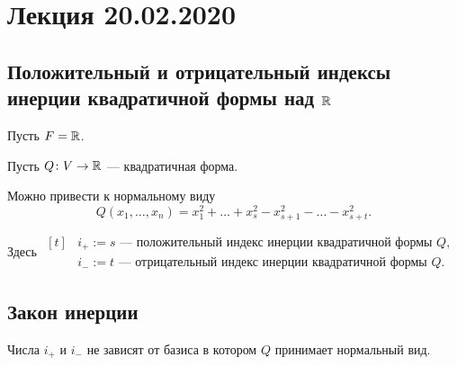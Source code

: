 \section{Лекция 20.02.2020}

\begin{comment}
    Для $F = \CC$ всякую квадратичную форму можно привести к виду \eqref{lec21:1}, где $k = \rk Q$.
    \begin{equation}
        \label{lec21:1}
        Q = x_1^2 + \dots + x_k^2
    .\end{equation}
\end{comment}


\subsection{Положительный и отрицательный индексы инерции квадратичной формы над $\mathbb{R}$}

Пусть $F = \mathbb{R}$.

Пусть $Q \colon V \to \mathbb{R}$ --- квадратичная форма.

Можно привести к нормальному виду
\begin{equation*}
    Q(x_1, \dots, x_n) = x_1^2 + \dots + x_s^2 - x_{s + 1}^2 - \dots - x_{s + t}^2
.\end{equation*}

Здесь
\begin{math}
    \begin{aligned}[t]
        &i_+ := s \text{ --- положительный индекс инерции квадратичной формы $Q$}, \\
        &i_- := t \text{ --- отрицательный индекс инерции квадратичной формы $Q$}.
    \end{aligned}
\end{math}


\subsection{Закон инерции}

\begin{theorem}
    Числа $i_+$ и $i_-$ не зависят от базиса в котором $Q$ принимает нормальный вид.
\end{theorem}

